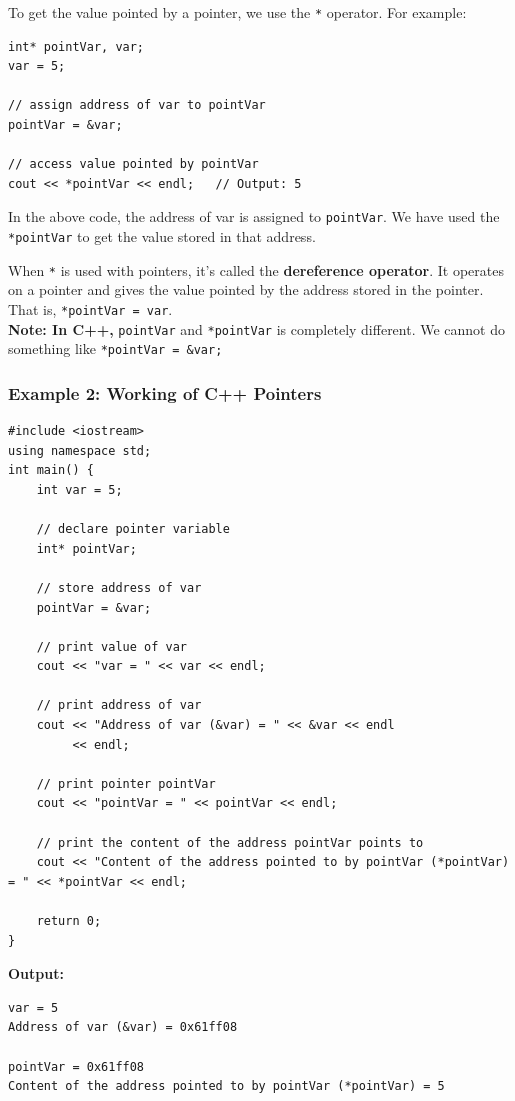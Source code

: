 To get the value pointed by a pointer, we use the \texttt{*} operator.
For example:

\begin{verbatim}
int* pointVar, var;
var = 5;

// assign address of var to pointVar
pointVar = &var;

// access value pointed by pointVar
cout << *pointVar << endl;   // Output: 5
\end{verbatim}

In the above code, the address of var is assigned to \texttt{pointVar}.
We have used the \texttt{*pointVar} to get the value stored in that
address.

When \texttt{*} is used with pointers, it's called the
\textbf{dereference operator}. It operates on a pointer and gives the
value pointed by the address stored in the pointer. That is,
\texttt{*pointVar\ =\ var}.\\

\textbf{Note: In C++,} \texttt{pointVar} and \texttt{*pointVar} is
completely different. We cannot do something like
\texttt{*pointVar\ =\ \&var;}

\doublelinewithspace{.0cm}

\hypertarget{example2}{%
\subsubsection{Example 2: Working of C++ Pointers}\label{example2}}

\begin{verbatim}
#include <iostream>
using namespace std;
int main() {
    int var = 5;

    // declare pointer variable
    int* pointVar;

    // store address of var
    pointVar = &var;

    // print value of var
    cout << "var = " << var << endl;

    // print address of var
    cout << "Address of var (&var) = " << &var << endl
         << endl;

    // print pointer pointVar
    cout << "pointVar = " << pointVar << endl;

    // print the content of the address pointVar points to
    cout << "Content of the address pointed to by pointVar (*pointVar) = " << *pointVar << endl;
    
    return 0;
}
\end{verbatim}

\textbf{Output:}
\begin{verbatim}
var = 5
Address of var (&var) = 0x61ff08

pointVar = 0x61ff08
Content of the address pointed to by pointVar (*pointVar) = 5
\end{verbatim}

